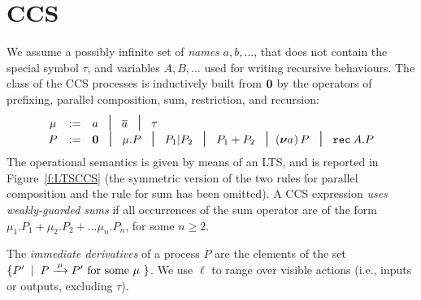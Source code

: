 
\section{CCS}
\label{ss:ccs}


We assume  a possibly infinite set of \emph{names} $a, b,
\ldots$, that does not contain the special symbol $\tau$, and
variables $A,B, \ldots$ used for writing recursive behaviours. 
The class  of the CCS processes is inductively built from ${\boldsymbol 0}$ by the operators
of  prefixing, parallel composition,  sum,
 restriction,  and recursion:
\begin{equation*}
\begin{array}{ccl}
\mu  & := &  a \; \midd \;  \outC a  \; \midd \;  \tau \\
P  & := &  \nil \; \midd \;  \mu . P \; \midd \;  P_1 |  P_2 \; \midd  \;
P_1 + P_2 \; \midd %
  (\res a\!)\, P  \;  \midd \;   \recu A  P   %
\end{array}
\end{equation*}
The operational semantics is given by means of an LTS, and is
reported in Figure~\ref{f:LTSCCS} (the symmetric version  of the two rules for
parallel composition and the rule for sum  has been omitted).
A CCS expression \emph{uses weakly-guarded sums} if all occurrences of
the sum  operator are of the form $\mu_1.P_1 + \mu_2.P_2 + \ldots
\mu_n.P_n$, for some $n \geq 2$.

 The \emph{immediate derivatives} of a
process $P$ are the elements of  the set $\{P' \st P \arr\mu P' \mbox{ for some $\mu$ }
\}$.   
We use $\ell$ to range over
 visible actions (i.e.,  inputs or outputs, excluding  $\tau$).

